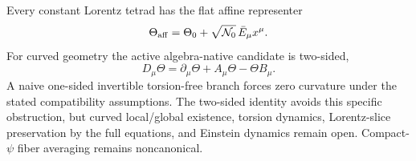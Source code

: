 \documentclass[11pt,a4paper]{article}
\begin{document}
Every constant Lorentz tetrad has the flat affine representer
\[
 \Theta_{\rm aff}=\Theta_0+\sqrt{\mathcal N_0}\,\bar E_\mu x^\mu.
\]
For curved geometry the active algebra-native candidate is two-sided,
\[
 D_\mu\Theta=\partial_\mu\Theta+A_\mu\Theta-\Theta B_\mu.
\]
A naive one-sided invertible torsion-free branch forces zero curvature under
the stated compatibility assumptions. The two-sided identity avoids this
specific obstruction, but curved local/global existence, torsion dynamics,
Lorentz-slice preservation by the full equations, and Einstein dynamics remain
open. Compact-$\psi$ fiber averaging remains noncanonical.
\end{document}
